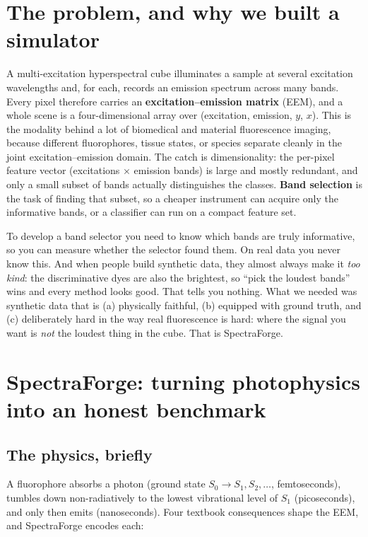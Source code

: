 \documentclass[11pt]{article}
\begin{document}
\section{The problem, and why we built a simulator}
A multi-excitation hyperspectral cube illuminates a sample at several excitation wavelengths and,
for each, records an emission spectrum across many bands. Every pixel therefore carries an
\textbf{excitation--emission matrix} (EEM), and a whole scene is a four-dimensional array over
(excitation, emission, $y$, $x$). This is the modality behind a lot of biomedical and material
fluorescence imaging, because different fluorophores, tissue states, or species separate cleanly
in the joint excitation--emission domain. The catch is dimensionality: the per-pixel feature vector
(excitations $\times$ emission bands) is large and mostly redundant, and only a small subset of
bands actually distinguishes the classes. \textbf{Band selection} is the task of finding that
subset, so a cheaper instrument can acquire only the informative bands, or a classifier can run on
a compact feature set.

To develop a band selector you need to know which bands are truly informative, so you can measure
whether the selector found them. On real data you never know this. And when people build synthetic
data, they almost always make it \emph{too kind}: the discriminative dyes are also the brightest, so
``pick the loudest bands'' wins and every method looks good. That tells you nothing. What we needed
was synthetic data that is (a) physically faithful, (b) equipped with ground truth, and (c)
deliberately hard in the way real fluorescence is hard: where the signal you want is \emph{not} the
loudest thing in the cube. That is SpectraForge.

\section{SpectraForge: turning photophysics into an honest benchmark}

\subsection{The physics, briefly}
A fluorophore absorbs a photon (ground state $S_0 \to S_1, S_2, \dots$, femtoseconds), tumbles
down non-radiatively to the lowest vibrational level of $S_1$ (picoseconds), and only then emits
(nanoseconds). Four textbook consequences shape the EEM, and SpectraForge encodes each:
\end{document}
